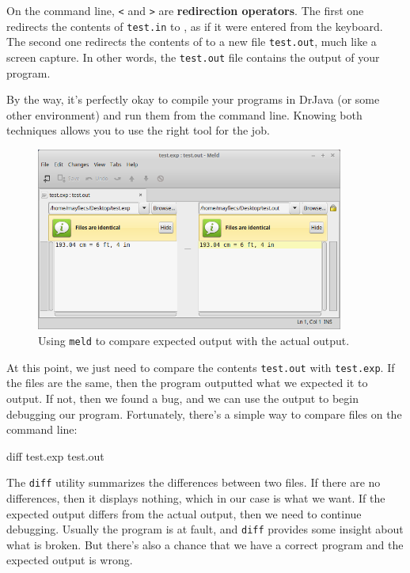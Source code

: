 
On the command line, {\tt <} and {\tt >} are {\bf redirection operators}.
The first one redirects the contents of {\tt test.in} to , as if it were entered from the keyboard.
The second one redirects the contents of  to a new file {\tt test.out}, much like a screen capture.
In other words, the {\tt test.out} file contains the output of your program.

By the way, it's perfectly okay to compile your programs in DrJava (or some other environment) and run them from the command line.
Knowing both techniques allows you to use the right tool for the job.


\begin{figure}[!ht]
\begin{center}
\includegraphics[width=0.9\textwidth]{figs/meld.png}
\caption{Using {\tt meld} to compare expected output with the actual output.}
\label{fig.meld}
\end{center}
\end{figure}

At this point, we just need to compare the contents {\tt test.out} with {\tt test.exp}.
If the files are the same, then the program outputted what we expected it to output.
If not, then we found a bug, and we can use the output to begin debugging our program.
Fortunately, there's a simple way to compare files on the command line:

\begin{stdout}
diff test.exp test.out
\end{stdout}

The {\tt diff} utility summarizes the differences between two files.
If there are no differences, then it displays nothing, which in our case is what we want.
If the expected output differs from the actual output, then we need to continue debugging.
Usually the program is at fault, and {\tt diff} provides some insight about what is broken.
But there's also a chance that we have a correct program and the expected output is wrong.

